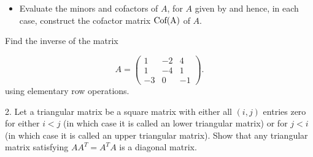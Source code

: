 \documentclass[12pt,a4paper]{article}
\begin{document}
	
	
	\begin{itemize}	
		\item Evaluate the  minors and cofactors of $A$, for $A$ given by
		and hence, in each case, construct the cofactor matrix $\textnormal{Cof(A)}$ of $A$.
	\end{itemize}
	
	
	
	Find the inverse of the  matrix 
	
	\begin{equation*}
	A=\left( \begin{array}{rrr}
	1 & -2 & 4\\
	1 & -4 & 1\\
	-3 & 0 & -1
	\end{array} \right).
	\end{equation*}
	using elementary row operations.
	
	
	2. Let a triangular matrix be a square matrix with either all $(i,j)$ entries zero for either $i<j$ 
	(in which case it is called an lower triangular matrix) or for $j<i$ (in which case it is called an upper triangular matrix). 
	Show that any triangular matrix satisfying $AA^T = A^TA$ is a diagonal matrix.
	
	
	
\end{document}
